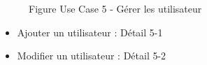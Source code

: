 \documentclass[a4paper, 11pt]{article}
\begin{document}
	\begin{figure}[h]
        \caption{Figure Use Case 5 - Gérer les utilisateur}
        \label{fig-diag-use-case-5}
        \end{figure}
        \begin{itemize}
        \item Ajouter un utilisateur : Détail 5-1
        \item Modifier un utilisateur : Détail 5-2
        \end{itemize}
        \clearpage
	\clearpage
\end{document}
